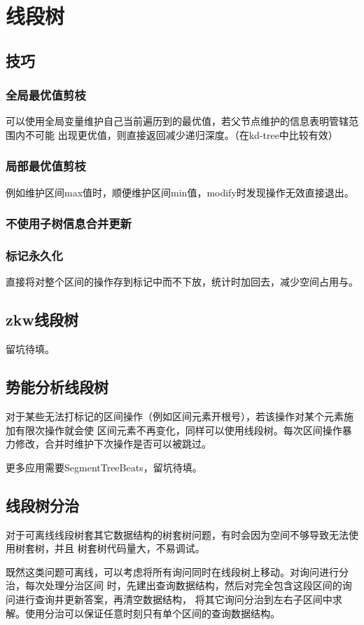 \section{线段树}
\subsection{技巧}
\subsubsection{全局最优值剪枝}
可以使用全局变量维护自己当前遍历到的最优值，若父节点维护的信息表明管辖范围内不可能
出现更优值，则直接返回减少递归深度。（在kd-tree中比较有效）
\subsubsection{局部最优值剪枝}
例如维护区间max值时，顺便维护区间min值，modify时发现操作无效直接退出。
\subsubsection{不使用子树信息合并更新}

\subsubsection{标记永久化}
直接将对整个区间的操作存到标记中而不下放，统计时加回去，减少空间占用与。
\subsection{zkw线段树}
留坑待填。
\subsection{势能分析线段树}
对于某些无法打标记的区间操作（例如区间元素开根号），若该操作对某个元素施加有限次操作就会使
区间元素不再变化，同样可以使用线段树。每次区间操作暴力修改，合并时维护下次操作是否可以被跳过。

更多应用需要SegmentTreeBeats，留坑待填。
\subsection{线段树分治}
对于可离线线段树套其它数据结构的树套树问题，有时会因为空间不够导致无法使用树套树，并且
树套树代码量大，不易调试。

既然这类问题可离线，可以考虑将所有询问同时在线段树上移动。对询问进行分治，每次处理分治区间
时，先建出查询数据结构，然后对完全包含这段区间的询问进行查询并更新答案，再清空数据结构，
将其它询问分治到左右子区间中求解。使用分治可以保证任意时刻只有单个区间的查询数据结构。

